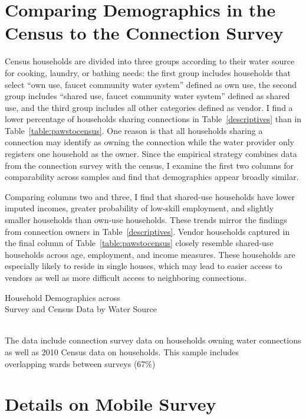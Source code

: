 \documentclass[12pt]{article}
\begin{document}
\begin{appendices}
\section{Comparing Demographics in the Census to the Connection Survey}\label{appendix:pawstocensus}

Census households are divided into three groups according to their water source for cooking, laundry, or bathing needs: the first group includes households that select ``own use, faucet community water system'' defined as own use, the second group includes ``shared use, faucet community water system'' defined as shared use, and the third group includes all other categories defined as vendor.  I find a lower percentage of households sharing connections in Table~\ref{descriptives} than in Table~\ref{table:pawstocensus}.  One reason is that all households sharing a connection may identify as owning the connection while the water provider only registers one household as the owner.  Since the empirical strategy combines data from the connection survey with the census, I examine the first two columns for comparability across samples and find that demographics appear broadly similar.

Comparing columns two and three, I find that shared-use households have lower imputed incomes, greater probability of low-skill employment, and slightly smaller households than own-use households.  These trends mirror the findings from connection owners in Table~\ref{descriptives}.  Vendor households captured in the final column of Table~\ref{table:pawstocensus} closely resemble shared-use households across age, employment, and income measures.  These households are especially likely to reside in single houses, which may lead to easier access to vendors as well as more difficult access to neighboring connections.

\begin{table}
\centering
\caption{Household Demographics across \\ Survey and Census Data by Water Source}\label{table:pawstocensus}
 \\
\footnotesize{The data include connection survey data on households owning water connections \\ as well as 2010 Census data on households. This sample includes \\ overlapping wards between  surveys (67\%)}
\end{table}


\section{Details on Mobile Survey}\label{appendix:pollfish}


\end{appendices}
\end{document}
